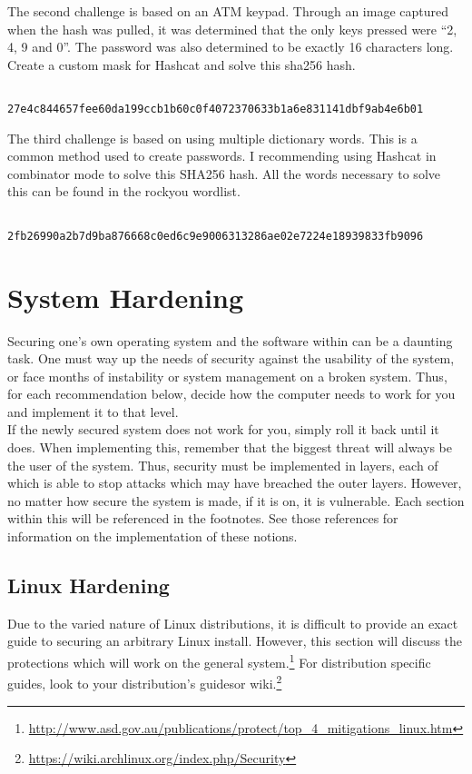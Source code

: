 \documentclass[a4paper,11pt]{report}
\begin{document}
			The second challenge is based on an ATM keypad. 
			Through an image captured when the hash was pulled, it was determined that the only keys pressed were ``2, 4, 9 and 0''. 
			The password was also determined to be exactly 16 characters long. 
			Create a custom mask for Hashcat and solve this sha256 hash. 
			\begin{verbatim}
				27e4c844657fee60da199ccb1b60c0f4072370633b1a6e831141dbf9ab4e6b01
			\end{verbatim}

			The third challenge is based on using multiple dictionary words. 
			This is a common method used to create passwords. 
			I recommending using Hashcat in combinator mode to solve this SHA256 hash. 
			All the words necessary to solve this can be found in the rockyou wordlist. 
			\begin{verbatim}
				2fb26990a2b7d9ba876668c0ed6c9e9006313286ae02e7224e18939833fb9096
			\end{verbatim}
\chapter{System Hardening}
	\label{ch:SystemHardening}
	Securing one's own operating system and the software within can be a daunting task. 
	One must way up the needs of security against the usability of the system, or face months of instability or system management on a broken system. 
	Thus, for each recommendation below, decide how the computer needs to work for you and implement it to that level.\\ 
	If the newly secured system does not work for you, simply roll it back until it does. 
	When implementing this, remember that the biggest threat will always be the user of the system. 
	Thus, security must be implemented in layers, each of which is able to stop attacks which may have breached the outer layers. However, no matter how secure the system is made, if it is on, it is vulnerable. 
	Each section within this will be referenced in the footnotes. See those references for information on the implementation of these notions. 
	\section{Linux Hardening}
		Due to the varied nature of Linux distributions, it is difficult to provide an exact guide to securing an arbitrary Linux install. 
		However, this section will discuss the protections which will work on the general system.\footnote{\url{http://www.asd.gov.au/publications/protect/top\_4\_mitigations\_linux.htm}} 
		For distribution specific guides, look to your distribution's guides\cite{FedoraSecGuide}or wiki.\footnote{\url{https://wiki.archlinux.org/index.php/Security}}
\end{document}
